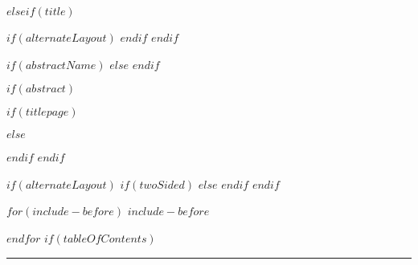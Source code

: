 \documentclass[$if(fontSize)$$fontSize$,%
	$if(language)$$language$,$else$english,$endif$%
	$if(paperSize)$$paperSize$,$else$ a4paper,%
	$endif$$if(classOptions)$$classOptions$,$endif$%
	$if(twoSided)$twoside,$endif$%
	$if(titlepage)$titlepage,$endif$%
	$if(centerEqs)$$else$fleqn$endif$]{$if(documentClass)$%
		$documentClass$$else$article$endif$}
\begin{document}
$elseif(title)$
    	\maketitle
        $if(alternateLayout)$
            \thispagestyle{fancy}
        $endif$
$endif$


$if(abstractName)$
    \renewcommand\abstractname{\sffamily $abstractName$}
$else$
    \renewcommand\abstractname{\sffamily Abstract}
$endif$

$if(abstract)$




$if(titlepage)$
    \restoregeometry
    \thispagestyle{plain}
	\begin{abstract}
		$abstract$
	\end{abstract}
$else$
\setlength{\absparindent}{0.51em}


	\begin{abstract}
	\begin{abstractBox} %
		$abstract$
	\end{abstractBox}
	\end{abstract}


$endif$
$endif$

$if(alternateLayout)$
    \fancyhf{}
    $if(twoSided)$
    $else$
        \SetBgContents{\color{black}\rule{.4pt}{\textheight + 2\headsep + 0.25pt - 0.5\footskip}}
        \SetBgVshift{\headsep}
    $endif$
    \renewcommand{\headrulewidth}{0.0pt}
    \renewcommand{\footrulewidth}{0.4pt}
    \renewcommand{\footrule}{{\rule{\textwidth + 0.5\marginparsep}{\footrulewidth}}}
    \fancyfoot[R]{\sffamily{\thepage}}
$endif$
 

$for(include-before)$
$include-before$

$endfor$
$if(tableOfContents)$
{
\hypersetup{linkcolor=black}
\setcounter{tocdepth}{$toc-depth$}
\tableofcontents
}

\noindent\rule{\linewidth}{0.05em}
\end{document}
